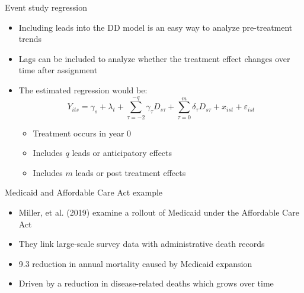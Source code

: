 \documentclass{beamer}
\begin{document}
\begin{frame}{Event study regression}
	
	\begin{itemize}
	\item Including leads into the DD model is an easy way to analyze pre-treatment trends
	\item Lags can be included to analyze whether the treatment effect changes over time after assignment
	\item The estimated regression would be:$$Y_{its} = \gamma_s + \lambda_t + \sum_{\tau=-2}^{-q}\gamma_{\tau}D_{s\tau} + \sum_{\tau=0}^m\delta_{\tau}D_{s\tau}+x_{ist}+\varepsilon_{ist}$$
		\begin{itemize}
		\item Treatment occurs in year 0
		\item Includes $q$ leads or anticipatory effects
		\item Includes $m$ leads or post treatment effects
		\end{itemize}
	\end{itemize}
\end{frame}


\begin{frame}{Medicaid and Affordable Care Act example}

\begin{itemize}
\item Miller, et al. (2019) examine a rollout of Medicaid under the Affordable Care Act
\item They link large-scale survey data with administrative death records
\item 9.3 reduction in annual mortality caused by Medicaid expansion
\item Driven by a reduction in disease-related deaths which grows over time
\end{itemize}

\end{frame}



\end{document}
